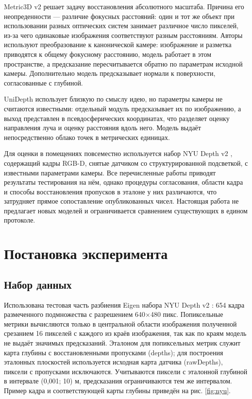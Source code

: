 \documentclass{misisarticle}
\begin{document}
Metric3D v2 \cite{pub3} решает задачу восстановления абсолютного масштаба. Причина его неопреденности --- различие фокусных расстояний: один и тот же объект при использовании разных оптических систем занимает различное число пикселей, из-за чего одинаковые изображения соответствуют разным расстояниям. Авторы используют преобразование к канонической камере: изображение и разметка приводятся к общему фокусному расстоянию, модель работает в этом пространстве, а предсказание пересчитывается обратно по параметрам исходной камеры. Дополнительно модель предсказывает нормали к поверхности, согласованные с глубиной.

UniDepth \cite{pub4} использует близкую по смыслу идею, но параметры камеры не считаются известными: отдельный модуль предсказывает их по изображению, а выход представлен в псевдосферических координатах, что разделяет оценку направления луча и оценку расстояния вдоль него. Модель выдаёт непосредственно облако точек в метрических единицах.

Для оценки в помещениях повсеместно используется набор NYU Depth v2 \cite{pub5}, содержащий кадры RGB-D, снятые датчиком со структурированной подсветкой, с известными параметрами камеры. Все перечисленные работы приводят результаты тестирования на нём, однако процедуры согласования, области кадра и способы восстановления пропусков в эталоне у них различаются, что затрудняет прямое сопоставление опубликованных чисел. Настоящая работа не предлагает новых моделей и ограничивается сравнением существующих в едином протоколе.

\section{Постановка эксперимента}

\subsection{Набор данных}

Использована тестовая часть разбиения Eigen набора NYU Depth v2 \cite{pub5}: 654 кадра размеченного подмножества с разрешением 640$\times$480 пикс. Попиксельные метрики вычисляются только в центральной области изображения полученной срезанием 16 пикселей с каждого из краёв изображения, так как по краям модель не выдаёт значимых предсказаний. Эталоном для попиксельных метрик служит карта глубины с восстановленными пропусками (depths); для построения эталонных плоскостей используется исходная карта датчика (rawDepths), пиксели с пропусками исключаются. Учитываются пиксели с эталонной глубиной в интервале (0,001; 10) м, предсказания ограничиваются тем же интервалом. Пример кадра и соответствующей карты глубины приведён на рис. \ref{fig:nyu}.
\end{document}
